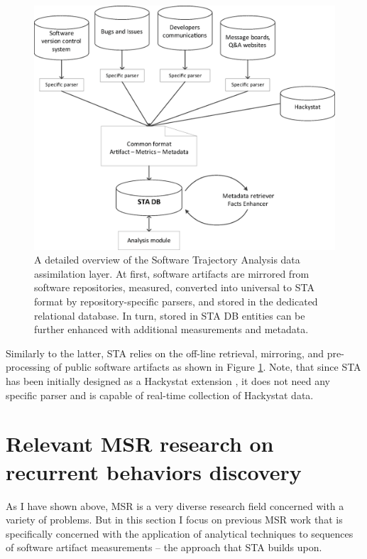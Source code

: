 \begin{figure}[t]
   \centering
   \includegraphics[width=115mm]{figures/Flow.eps}
   \caption[A detailed overview of the Software Trajectory Analysis data assimilation layer.]
   {A detailed overview of the Software Trajectory Analysis data assimilation layer. 
    At first, software artifacts are mirrored from software repositories, measured, converted into 
    universal to STA format by repository-specific parsers, and stored in the dedicated relational database.
    In turn, stored in STA DB entities can be further enhanced with additional measurements and metadata.}
   \label{fig:sta-assimilation}
\end{figure}

Similarly to the latter, STA relies on the off-line retrieval, mirroring, and pre-processing of public software artifacts as
shown in Figure \ref{fig:sta-assimilation}. Note, that since STA has been initially designed as a Hackystat extension 
\cite{csdl2-10-09}, it does not need any specific parser and is capable of real-time collection of Hackystat data.

\section{Relevant MSR research on recurrent behaviors discovery}
As I have shown above, MSR is a very diverse research field concerned with a variety of problems. 
But in this section I focus on previous MSR work that is specifically concerned with the application of analytical 
techniques to sequences of software artifact measurements -- the approach that STA builds upon.

